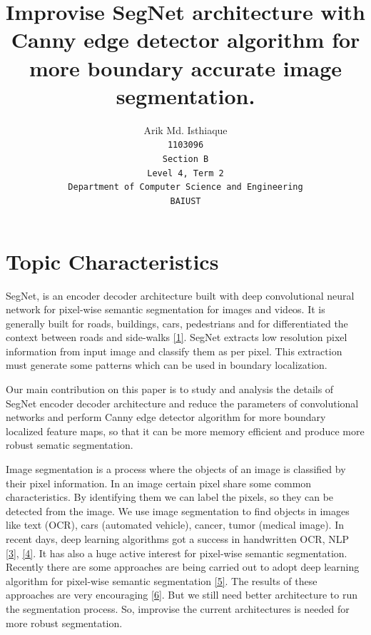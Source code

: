 \documentclass[a4paper,12pt]{article}
\begin{document}
\title{Improvise SegNet architecture with Canny edge detector algorithm for more boundary accurate image segmentation.}

\author{
  Arik Md. Isthiaque\\
  \texttt{1103096}\\
  \texttt{Section B}\\
  \texttt{Level 4, Term 2}\\
  \texttt{Department of Computer Science and Engineering}\\
  \texttt{BAIUST}
}

\maketitle

\section{Topic Characteristics}
SegNet, is an encoder decoder architecture built with deep convolutional neural network for pixel-wise semantic segmentation for images and videos. It is generally built for roads, buildings, cars, pedestrians and for differentiated the context between roads and side-walks \hyperlink{1}{[1]}. SegNet extracts low resolution pixel information from input image and classify them as per pixel. This extraction must generate some patterns which can be used in boundary localization.

Our main contribution on this paper is to study and analysis the details of SegNet encoder decoder architecture and reduce the parameters of convolutional networks and perform Canny edge detector algorithm for more boundary localized feature maps, so that it can be more memory efficient and produce more robust sematic segmentation.  

Image segmentation is a process where the objects of an image is classified by their pixel information. In an image certain pixel share some common characteristics. By identifying them we can label the pixels, so they can be detected from the image. We use image segmentation to find objects in images like text (OCR), cars (automated vehicle), cancer, tumor (medical image). In recent days, deep learning algorithms got a success in handwritten OCR, NLP  \hyperlink{3}{[3]},  \hyperlink{4}{[4]}. It has also a huge active interest for pixel-wise semantic segmentation. Recently there are some approaches are being carried out to adopt deep learning algorithm for pixel-wise semantic segmentation  \hyperlink{5}{[5]}. The results of these approaches are very encouraging  \hyperlink{6}{[6]}. But we still need better architecture to run the segmentation process. So, improvise the current architectures is needed for more robust segmentation.
\end{document}
